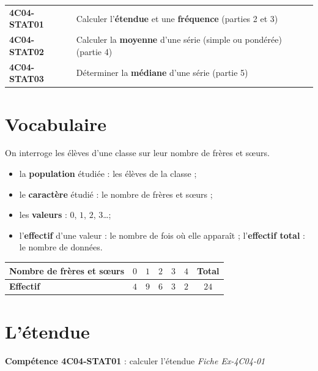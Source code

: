 \documentclass[11pt]{article}
\newcommand{\comp}[2]{\par\smallskip\noindent\colorbox{gray!15}{\parbox{\dimexpr\linewidth-2\fboxsep}{\small\textbf{Compétence #1} : #2}}\par\smallskip}
\begin{document}
\begin{tcolorbox}[colback=white,colframe=black,boxrule=0.6pt,arc=2mm,title={\textbf{Ce que je dois savoir faire à la fin du chapitre}},coltitle=black,colbacktitle=gray!15]
\begin{tabular}{@{}ll@{}}
\textbf{4C04-STAT01} & Calculer l'\textbf{étendue} et une \textbf{fréquence} \hfill (parties 2 et 3)\\
\textbf{4C04-STAT02} & Calculer la \textbf{moyenne} d'une série (simple ou pondérée) \hfill (partie 4)\\
\textbf{4C04-STAT03} & Déterminer la \textbf{médiane} d'une série \hfill (partie 5)\\
\end{tabular}
\end{tcolorbox}

\section{Vocabulaire}

\begin{vocabulaire}
On interroge les élèves d'une classe sur leur nombre de frères et sœurs.
\begin{itemize}
\item la \textbf{population} étudiée : les élèves de la classe ;
\item le \textbf{caractère} étudié : le nombre de frères et sœurs ;
\item les \textbf{valeurs} : $0$, $1$, $2$, $3$\ldots ;
\item l'\textbf{effectif} d'une valeur : le nombre de fois où elle apparaît ;
l'\textbf{effectif total} : le nombre de données.
\end{itemize}
\end{vocabulaire}

\begin{center}
\renewcommand{\arraystretch}{1.4}
\begin{tabular}{|l|c|c|c|c|c||c|}
\hline
\textbf{Nombre de frères et sœurs} & $0$ & $1$ & $2$ & $3$ & $4$ & \textbf{Total} \\ \hline
\textbf{Effectif} & $4$ & $9$ & $6$ & $3$ & $2$ & $24$ \\ \hline
\end{tabular}
\end{center}

\section{L'étendue}
\comp{4C04-STAT01}{calculer l'étendue \hfill \textit{Fiche Ex-4C04-01}}
\end{document}
